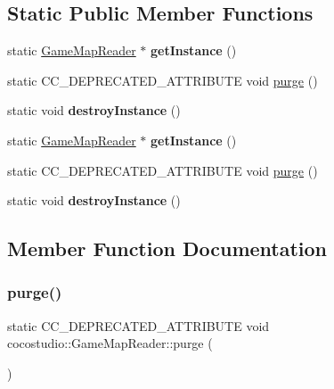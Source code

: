 \subsection*{Static Public Member Functions}
\begin{DoxyCompactItemize}
\item 
\mbox{\label{classcocostudio_1_1GameMapReader_aa4d0f1563daae99cf29e5d213dd15e49}} 
static \hyperlink{classcocostudio_1_1GameMapReader}{Game\+Map\+Reader} $\ast$ {\bfseries get\+Instance} ()
\item 
static C\+C\+\_\+\+D\+E\+P\+R\+E\+C\+A\+T\+E\+D\+\_\+\+A\+T\+T\+R\+I\+B\+U\+TE void \hyperlink{classcocostudio_1_1GameMapReader_ad240192e277b51042d9a9788ac19c3c8}{purge} ()
\item 
\mbox{\label{classcocostudio_1_1GameMapReader_ae4d220c81eec889874138542fdf7cd71}} 
static void {\bfseries destroy\+Instance} ()
\item 
\mbox{\label{classcocostudio_1_1GameMapReader_a4997c6dc1f58f0a4e2ef52b6fc8736b9}} 
static \hyperlink{classcocostudio_1_1GameMapReader}{Game\+Map\+Reader} $\ast$ {\bfseries get\+Instance} ()
\item 
static C\+C\+\_\+\+D\+E\+P\+R\+E\+C\+A\+T\+E\+D\+\_\+\+A\+T\+T\+R\+I\+B\+U\+TE void \hyperlink{classcocostudio_1_1GameMapReader_ad240192e277b51042d9a9788ac19c3c8}{purge} ()
\item 
\mbox{\label{classcocostudio_1_1GameMapReader_add619ceb620dbd86d2825fff553baf49}} 
static void {\bfseries destroy\+Instance} ()
\end{DoxyCompactItemize}


\subsection{Member Function Documentation}
\mbox{\label{classcocostudio_1_1GameMapReader_ad240192e277b51042d9a9788ac19c3c8}} 
\subsubsection{\texorpdfstring{purge()}{purge()}\hspace{0.1cm}{\footnotesize\ttfamily [1/2]}}
{\footnotesize\ttfamily static C\+C\+\_\+\+D\+E\+P\+R\+E\+C\+A\+T\+E\+D\+\_\+\+A\+T\+T\+R\+I\+B\+U\+TE void cocostudio\+::\+Game\+Map\+Reader\+::purge (\begin{DoxyParamCaption}{ }\end{DoxyParamCaption})\hspace{0.3cm}{\ttfamily [static]}}


